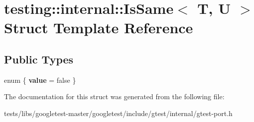 \hypertarget{structtesting_1_1internal_1_1IsSame}{}\section{testing\+:\+:internal\+:\+:Is\+Same$<$ T, U $>$ Struct Template Reference}
\label{structtesting_1_1internal_1_1IsSame}
\subsection*{Public Types}
\begin{DoxyCompactItemize}
\item 
\mbox{\label{structtesting_1_1internal_1_1IsSame_a2cfeb9b5d672af954b14a257f26c67f4}} 
enum \{ {\bfseries value} = false
 \}
\end{DoxyCompactItemize}


The documentation for this struct was generated from the following file\+:\begin{DoxyCompactItemize}
\item 
tests/libs/googletest-\/master/googletest/include/gtest/internal/gtest-\/port.\+h\end{DoxyCompactItemize}
